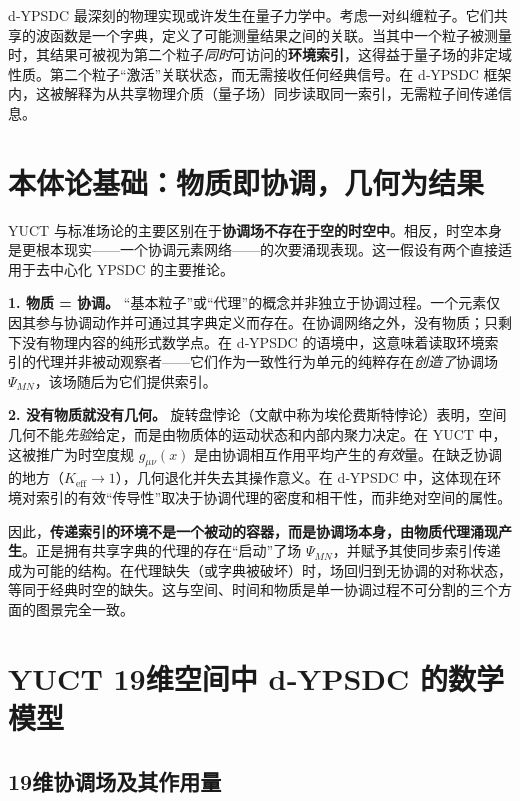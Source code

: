 \documentclass[11pt,a4paper]{article}
\begin{document}
	d‑YPSDC 最深刻的物理实现或许发生在量子力学中。考虑一对纠缠粒子。它们共享的波函数是一个字典，定义了可能测量结果之间的关联。当其中一个粒子被测量时，其结果可被视为第二个粒子\emph{同时}可访问的\textbf{环境索引}，这得益于量子场的非定域性质。第二个粒子“激活”关联状态，而无需接收任何经典信号。在 d‑YPSDC 框架内，这被解释为从共享物理介质（量子场）同步读取同一索引，无需粒子间传递信息。
	
	\section{本体论基础：物质即协调，几何为结果}
	
	YUCT 与标准场论的主要区别在于\textbf{协调场不存在于空的时空中}。相反，时空本身是更根本现实——一个协调元素网络——的次要涌现表现。这一假设有两个直接适用于去中心化 YPSDC 的主要推论。
	
	\textbf{1. 物质 = 协调。} “基本粒子”或“代理”的概念并非独立于协调过程。一个元素仅因其参与协调动作并可通过其字典定义而存在。在协调网络之外，没有物质；只剩下没有物理内容的纯形式数学点。在 d‑YPSDC 的语境中，这意味着读取环境索引的代理并非被动观察者——它们作为一致性行为单元的纯粹存在\emph{创造了}协调场 \(\Psi_{MN}\)，该场随后为它们提供索引。
	
	\textbf{2. 没有物质就没有几何。} 旋转盘悖论（文献中称为埃伦费斯特悖论）表明，空间几何不能\emph{先验}给定，而是由物质体的运动状态和内部内聚力决定。在 YUCT 中，这被推广为时空度规 \(g_{\mu\nu}(x)\) 是由协调相互作用平均产生的\emph{有效}量。在缺乏协调的地方（\(K_{\mathrm{eff}} \to 1\)），几何退化并失去其操作意义。在 d‑YPSDC 中，这体现在环境对索引的有效“传导性”取决于协调代理的密度和相干性，而非绝对空间的属性。
	
	因此，\textbf{传递索引的环境不是一个被动的容器，而是协调场本身，由物质代理涌现产生}。正是拥有共享字典的代理的存在“启动”了场 \(\Psi_{MN}\)，并赋予其使同步索引传递成为可能的结构。在代理缺失（或字典被破坏）时，场回归到无协调的对称状态，等同于经典时空的缺失。这与空间、时间和物质是单一协调过程不可分割的三个方面的图景完全一致。
	
	\section{YUCT 19维空间中 d‑YPSDC 的数学模型}
	\label{sec:math-model}
	
	\subsection{19维协调场及其作用量}
	
\end{document}
